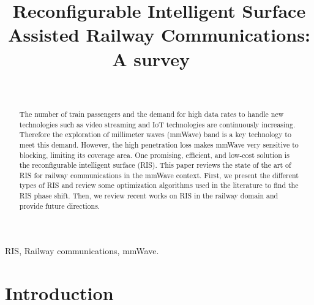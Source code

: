 \documentclass[conference]{IEEEtran}
\begin{document}
\title{Reconfigurable Intelligent Surface Assisted Railway Communications: A survey 
\
}


\author{\\%



}
\maketitle

\begin{abstract}
The number of train passengers and the demand for high data rates to handle new technologies such as video streaming and IoT technologies are continuously increasing. Therefore the exploration of millimeter waves (mmWave) band is a key technology to meet this demand. However, the high penetration loss makes mmWave very sensitive to blocking, limiting its coverage area. One promising, efficient, and low-cost solution is the reconfigurable intelligent surface (RIS). This paper reviews the state of the art of RIS for railway communications in the mmWave context. First, we present the different types of RIS and review some optimization algorithms used in the literature to find the RIS phase shift. Then, we review recent works on RIS in the railway domain and provide future directions.
\end{abstract}

\begin{IEEEkeywords} RIS, Railway communications, mmWave.

\end{IEEEkeywords}

\section{Introduction}\label{Intro}
\end{document}
